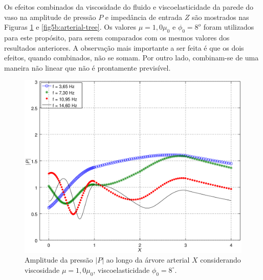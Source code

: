 \documentclass[
        english,			
        brazil			        %
        ,<...>]{abntbibufjf}
\begin{document}
Os efeitos combinados da viscosidade do fluido e viscoelasticidade da parede do vaso na amplitude de pressão $P$ e impedância de entrada $Z$ são mostrados nas Figuras \ref{fig5a:arterial-tree} e \ref{fig5b:arterial-tree}. Os valores $\mu = 1,0 \mu_0$ e $\phi_0 = 8^o$ foram utilizados para este propósito, para serem comparados com os mesmos valores dos resultados anteriores. A observação mais importante a ser feita é que os dois efeitos, quando combinados, não se somam. Por outro lado, combinam-se de uma maneira não linear que não é prontamente previsível.

\begin{figure}[!htbp]
	\centering
	\includegraphics[scale=0.7]{figure5-result-new/Fig5_P_visc1_phi8_new2.png}
	\caption{Amplitude da pressão $|P|$ ao longo da árvore arterial $X$ considerando viscosidade $\mu = 1,0 \mu_0$, viscoelasticidade $\phi_0 = 8^{\circ}$.}
	\label{fig5a:arterial-tree}%
\end{figure}
\end{document}
